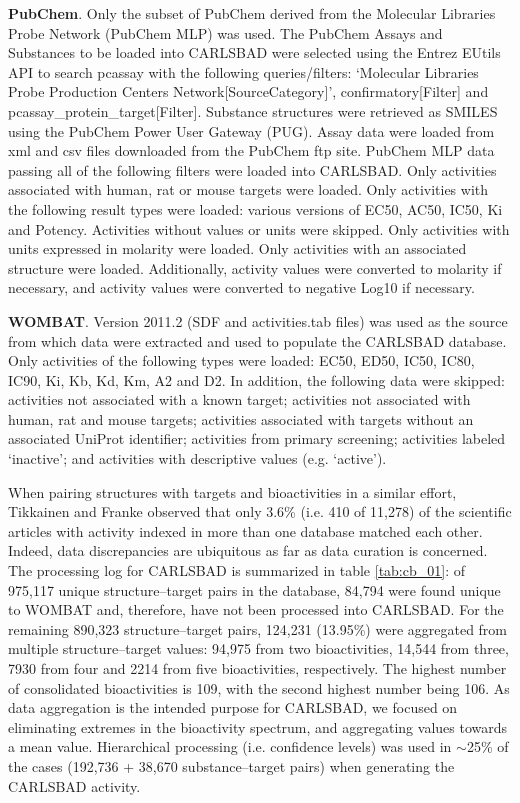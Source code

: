 \textbf{PubChem}. Only the subset of PubChem derived from the Molecular Libraries Probe Network (PubChem MLP) was used. The PubChem Assays and Substances to be loaded into CARLSBAD were selected using the Entrez EUtils API to search pcassay with the following queries/filters: ‘Molecular Libraries Probe Production Centers Network[SourceCategory]’, confirmatory[Filter] and pcassay\_protein\_target[Filter]. Substance structures were retrieved as SMILES using the PubChem Power User Gateway (PUG). Assay data were loaded from xml and csv files downloaded from the PubChem ftp site. PubChem MLP data passing all of the following filters were loaded into CARLSBAD. Only activities associated with human, rat or mouse targets were loaded. Only activities with the following result types were loaded: various versions of EC50, AC50, IC50, Ki and Potency. Activities without values or units were skipped. Only activities with units expressed in molarity were loaded. Only activities with an associated structure were loaded. Additionally, activity values were converted to molarity if necessary, and activity values were converted to negative Log10 if necessary.

\textbf{WOMBAT}. Version 2011.2 (SDF and activities.tab files) was used as the source from which data were extracted and used to populate the CARLSBAD database. Only activities of the following types were loaded: EC50, ED50, IC50, IC80, IC90, Ki, Kb, Kd, Km, A2 and D2. In addition, the following data were skipped: activities not associated with a known target; activities not associated with human, rat and mouse targets; activities associated with targets without an associated UniProt identifier; activities from primary screening; activities labeled ‘inactive’; and activities with descriptive values (e.g. ‘active’).

When pairing structures with targets and bioactivities in a similar effort, Tikkainen and Franke observed that only 3.6\% (i.e. 410 of 11,278) of the scientific articles with activity indexed in more than one database matched each other. Indeed, data discrepancies are ubiquitous as far as data curation is concerned\cite{Tiikkainen2012-cw}. The processing log for CARLSBAD is summarized in table \ref{tab:cb_01}: of 975,117 unique structure–target pairs in the database, 84,794 were found unique to WOMBAT and, therefore, have not been processed into CARLSBAD. For the remaining 890,323 structure–target pairs, 124,231 (13.95\%) were aggregated from multiple structure–target values: 94,975 from two bioactivities, 14,544 from three, 7930 from four and 2214 from five bioactivities, respectively. The highest number of consolidated bioactivities is 109, with the second highest number being 106. As data aggregation is the intended purpose for CARLSBAD, we focused on eliminating extremes in the bioactivity spectrum, and aggregating values towards a mean value. Hierarchical processing (i.e. confidence levels) was used in $\sim$25\% of the cases (192,736 + 38,670 substance–target pairs) when generating the CARLSBAD activity.


